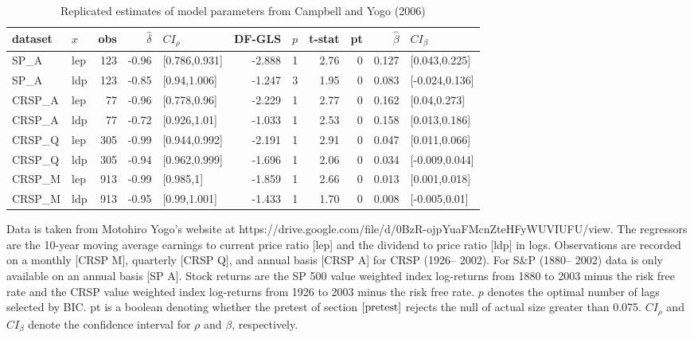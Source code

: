 \documentclass{article}
\begin{document}
\begin{table}[ht]
\centering
\caption{Replicated estimates of model parameters from Campbell and Yogo (2006)}
\label{tab:cy_sp}
\begin{threeparttable}
\begin{tabular}{llrrlrrrrrl}
  \hline
dataset & $x$ & obs & $\hat{\delta}$ & $CI_{\rho}$ & DF-GLS & $p$ &t-stat & pt & $\hat{\beta}$ & $CI_{\beta}$ \\ 
  \hline
  SP\_A & lep & 123 & -0.96 & [0.786,0.931] & -2.888 & 1 & 2.76 & 0 & 0.127 & [0.043,0.225] \\ 
  SP\_A & ldp & 123 & -0.85 & [0.94,1.006] & -1.247 & 3 & 1.95 & 0 & 0.083 & [-0.024,0.136] \\ 
  CRSP\_A & lep & 77 & -0.96 & [0.778,0.96] & -2.229 & 1 & 2.77 & 0 & 0.162 & [0.04,0.273] \\ 
  CRSP\_A & ldp & 77 & -0.72 & [0.926,1.01] & -1.033 & 1 & 2.53 & 0 & 0.158 & [0.013,0.186] \\ 
  CRSP\_Q & lep & 305 & -0.99 & [0.944,0.992] & -2.191 & 1 & 2.91 & 0 & 0.047 & [0.011,0.066] \\ 
  CRSP\_Q & ldp & 305 & -0.94 & [0.962,0.999] & -1.696 & 1 & 2.06 & 0 & 0.034 & [-0.009,0.044] \\ 
  CRSP\_M & lep & 913 & -0.99 & [0.985,1] & -1.859 & 1 & 2.66 & 0 & 0.013 & [0.001,0.018] \\ 
  CRSP\_M & ldp & 913 & -0.95 & [0.99,1.001] & -1.433 & 1 & 1.70 & 0 & 0.008 & [-0.005,0.01] \\ 
\hline
\end{tabular}
 \begin{tablenotes}
 \small
\item Data is taken from Motohiro Yogo's website at https://drive.google.com/file/d/0BzR-ojpYuaFMcnZteHFyWUVIUFU/view. The regressors are the 10-year moving average earnings to current price ratio [lep] and the dividend to price ratio [ldp] in logs. Observations are recorded on a monthly [CRSP M], quarterly [CRSP Q], and annual basis [CRSP A] for CRSP (1926– 2002). For S\&P (1880– 2002) data is only available on an annual basis [SP A]. Stock returns are the SP 500 value weighted index log-returns from 1880 to 2003 minus the risk free rate and the CRSP value weighted index log-returns from 1926 to 2003 minus the risk free rate. $p$ denotes the optimal number of lags selected by BIC. pt is a boolean denoting whether the pretest of section $\ref{pretest}$ rejects the null of actual size greater than 0.075. $CI_{\rho}$ and $CI_{\beta}$ denote the confidence interval for $\rho$ and $\beta$, respectively.
\end{tablenotes}
\end{threeparttable}
\end{table}
\end{document}
